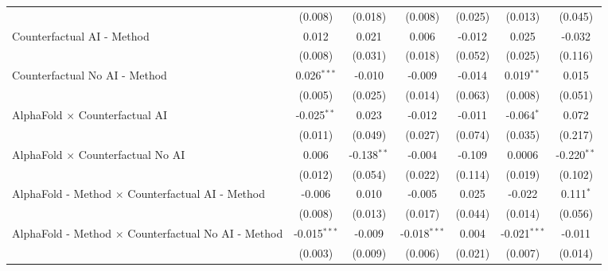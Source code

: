 \begin{tabular}{lcccccc}
                                                              & (0.008)        & (0.018)       & (0.008)        & (0.025)       & (0.013)        & (0.045)\\   
   Counterfactual AI - Method                                 & 0.012          & 0.021         & 0.006          & -0.012        & 0.025          & -0.032\\   
                                                              & (0.008)        & (0.031)       & (0.018)        & (0.052)       & (0.025)        & (0.116)\\   
   Counterfactual No AI - Method                              & 0.026$^{***}$  & -0.010        & -0.009         & -0.014        & 0.019$^{**}$   & 0.015\\   
                                                              & (0.005)        & (0.025)       & (0.014)        & (0.063)       & (0.008)        & (0.051)\\   
   AlphaFold $\times$ Counterfactual AI                       & -0.025$^{**}$  & 0.023         & -0.012         & -0.011        & -0.064$^{*}$   & 0.072\\   
                                                              & (0.011)        & (0.049)       & (0.027)        & (0.074)       & (0.035)        & (0.217)\\   
   AlphaFold $\times$ Counterfactual No AI                    & 0.006          & -0.138$^{**}$ & -0.004         & -0.109        & 0.0006         & -0.220$^{**}$\\   
                                                              & (0.012)        & (0.054)       & (0.022)        & (0.114)       & (0.019)        & (0.102)\\   
   AlphaFold - Method $\times$ Counterfactual AI - Method     & -0.006         & 0.010         & -0.005         & 0.025         & -0.022         & 0.111$^{*}$\\   
                                                              & (0.008)        & (0.013)       & (0.017)        & (0.044)       & (0.014)        & (0.056)\\   
   AlphaFold - Method $\times$ Counterfactual No AI - Method  & -0.015$^{***}$ & -0.009        & -0.018$^{***}$ & 0.004         & -0.021$^{***}$ & -0.011\\   
                                                              & (0.003)        & (0.009)       & (0.006)        & (0.021)       & (0.007)        & (0.014)\\   

\end{tabular}
